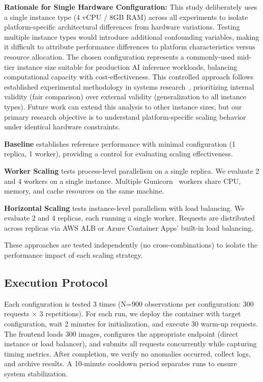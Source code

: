 \textbf{Rationale for Single Hardware Configuration:} This study deliberately uses a single instance type (4 vCPU / 8GB RAM) across all experiments to isolate platform-specific architectural differences from hardware variations. Testing multiple instance types would introduce additional confounding variables, making it difficult to attribute performance differences to platform characteristics versus resource allocation. The chosen configuration represents a commonly-used mid-tier instance size suitable for production AI inference workloads, balancing computational capacity with cost-effectiveness. This controlled approach follows established experimental methodology in systems research~\cite{chieu2010dynamic}, prioritizing internal validity (fair comparison) over external validity (generalization to all instance types). Future work can extend this analysis to other instance sizes, but our primary research objective is to understand platform-specific scaling behavior under identical hardware constraints.

\textbf{Baseline} establishes reference performance with minimal configuration (1 replica, 1 worker), providing a control for evaluating scaling effectiveness.

\textbf{Worker Scaling} tests process-level parallelism on a single replica. We evaluate 2 and 4 workers on a single instance. Multiple Gunicorn~\cite{gunicorn2023docs} workers share CPU, memory, and cache resources on the same machine.

\textbf{Horizontal Scaling} tests instance-level parallelism with load balancing. We evaluate 2 and 4 replicas, each running a single worker. Requests are distributed across replicas via AWS ALB or Azure Container Apps' built-in load balancing.

These approaches are tested independently (no cross-combinations) to isolate the performance impact of each scaling strategy.

\subsection{Execution Protocol}

Each configuration is tested 3 times (N=900 observations per configuration: 300 requests × 3 repetitions). For each run, we deploy the container with target configuration, wait 2 minutes for initialization, and execute 30 warm-up requests. The frontend loads 300 images, configures the appropriate endpoint (direct instance or load balancer), and submits all requests concurrently while capturing timing metrics. After completion, we verify no anomalies occurred, collect logs, and archive results. A 10-minute cooldown period separates runs to ensure system stabilization.

